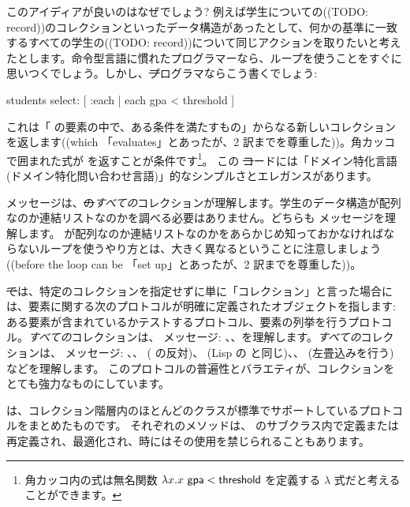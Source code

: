 \documentclass[a4paper,10pt,twoside]{book}
\begin{document}
このアイディアが良いのはなぜでしょう?
例えば学生についての((TODO: record))のコレクションといったデータ構造があったとして、何かの基準に一致するすべての学生の((TODO: record))について同じアクションを取りたいと考えたとします。命令型言語に慣れたプログラマーなら、ループを使うことをすぐに思いつくでしょう。しかし、\st プログラマならこう書くでしょう:
\begin{code}{}
students select: [ :each | each gpa < threshold ]
\end{code}
\noindent
これは「 の要素の中で、ある条件を満たすもの」からなる新しいコレクションを返します((which 「evaluates」とあったが、2 訳までを尊重した))。角カッコで囲まれた式が  を返すことが条件です\footnote{角カッコ内の式は無名関数 $\lambda x. x~{\sf gpa} < {\sf threshold}$ を定義する $\lambda$ 式だと考えることができます。
}。
この \st コードには「ドメイン特化言語(ドメイン特化問い合わせ言語)」的なシンプルさとエレガンスがあります。

 メッセージは、\st の\emph{すべての}コレクションが理解します。学生のデータ構造が配列なのか連結リストなのかを調べる必要はありません。どちらも  メッセージを理解します。  が配列なのか連結リストなのかをあらかじめ知っておかなければならないループを使うやり方とは、大きく異なるということに注意しましょう((before the loop can be 「set up」とあったが、2 訳までを尊重した))。

\st では、特定のコレクションを指定せずに単に「コレクション」と言った場合には、要素に関する次のプロトコルが明確に定義されたオブジェクトを指します: ある要素が含まれているかテストするプロトコル、要素の列挙を行うプロトコル。\emph{すべての}コレクションは、 メッセージ: \mbox{、}\mbox{、}を理解します。\emph{すべての}コレクションは、 メッセージ: 、、 ( の反対)、 (Lisp の と同じ)、、 (左畳込みを行う) などを理解します。
このプロトコルの普遍性とバラエティが、コレクションをとても強力なものにしています。

 は、コレクション階層内のほとんどのクラスが標準でサポートしているプロトコルをまとめたものです。
それぞれのメソッドは、 のサブクラス内で定義または再定義され、最適化され、時にはその使用を禁じられることもあります。
\end{document}
